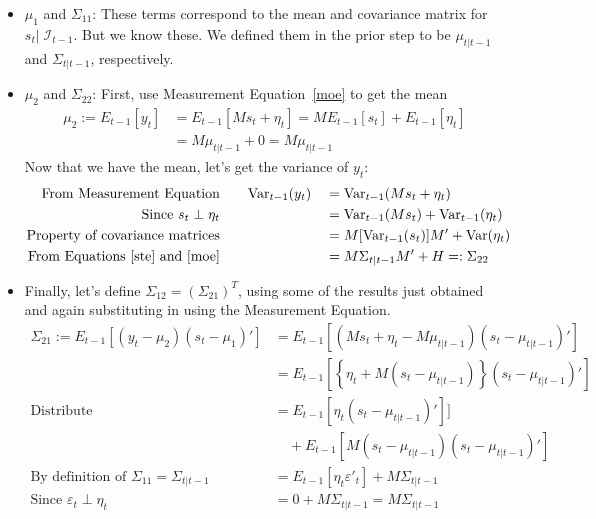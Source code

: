 \documentclass[a4paper,12pt]{article}
\begin{document}
\begin{itemize}
  \item $\mu_1$ and $\Sigma_{11}$: These terms correspond
    to the mean and covariance matrix for $s_t |\;
    \mathcal{I}_{t-1}$. But we know these. We defined them
    in the prior step to be $\mu_{t|t-1}$ and
    $\Sigma_{t|t-1}$, respectively.

  \item $\mu_2$ and $\Sigma_{22}$: First, use Measurement
    Equation~\ref{moe} to get the mean
    \begin{align*}
      \mu_2 := E_{t-1}[y_t ] &=
        E_{t-1}[Ms_t + \eta_t ] =
        ME_{t-1}[s_t]
        + E_{t-1}[\eta_t ]\\
        &= M \mu_{t|t-1} + 0 = M\mu_{t|t-1}
    \end{align*}
    Now that we have the mean, let's get the variance of $y_t$:
    \begin{alignat*}{2}
      \text{From Measurement Equation} &\qquad
        \text{Var}_{t-1}(y_t)
        &&= \text{Var}_{t-1}(Ms_t + \eta_t) \\
      \text{Since $s_t\perp\eta_t$} &\qquad
        &&= \text{Var}_{t-1}(Ms_t)
        + \text{Var}_{t-1}(\eta_t)\\
      \text{Property of covariance matrices} &\qquad
        &&= M [\text{Var}_{t-1}(s_t)] M'
        + \text{Var}(\eta_t) \\
      \text{From Equations~\ref{ste} and~\ref{moe}} &\qquad
        &&= M\Sigma_{t|t-1} M' + H =: \Sigma_{22}
    \end{alignat*}

  \item Finally, let's define $\Sigma_{12} =
    (\Sigma_{21})^T$, using some of the results just
    obtained and again substituting in using the
    Measurement Equation.
    \begin{align*}
      \Sigma_{21} := E_{t-1}\left[(y_t-\mu_2)(s_t - \mu_1)'
        \right] &=
        E_{t-1}\left[(Ms_t+\eta_t-M\mu_{t|t-1})(s_t-\mu_{t|t-1})'
        \right]  \\
      &= E_{t-1}\left[\left\{\eta_t+ M(s_t-\mu_{t|t-1})\right\}
        (s_t-\mu_{t|t-1})' \right]  \\
      \text{Distribute}
      \qquad
      &= E_{t-1}\left[\eta_t(s_t-\mu_{t|t-1})'\right]]\\
      &\quad + E_{t-1}\left[M(s_t-\mu_{t|t-1})
        (s_t-\mu_{t|t-1})'\right]  \\
      \text{By definition of $\Sigma_{11}=\Sigma_{t|t-1}$}
      \qquad
      &= E_{t-1}\left[\eta_t\varepsilon'_t\right]
        + M\Sigma_{t|t-1} \\
      \text{Since $\varepsilon_t\perp \eta_t$} \qquad
      &= 0 + M\Sigma_{t|t-1}  = M\Sigma_{t|t-1}
    \end{align*}
\end{itemize}
\end{document}
